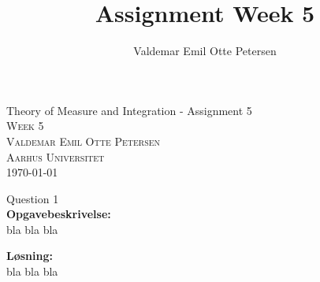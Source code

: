 \documentclass{article}
\author{Valdemar Emil Otte Petersen}
\title{Assignment Week 5}
\begin{document}
\begingroup

\centering 
{\LARGE Theory of Measure and Integration - Assignment 5}\\ %
\vspace*{1\baselineskip}
\scshape
Week 5\\ %
Valdemar Emil Otte Petersen\\ %
{\small Aarhus Universitet}\\ 
{\small \today}

\endgroup


{\LARGE Question 1}\\
\textbf{Opgavebeskrivelse:}\\
bla bla bla

\vspace{15px}
\textbf{Løsning:}\\
bla bla bla

\vspace{35px}
\end{document}
